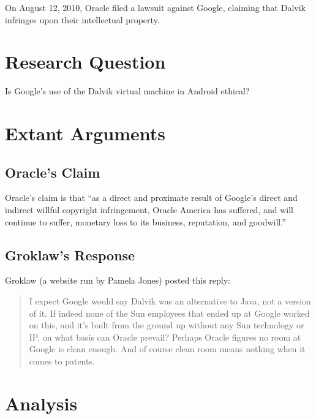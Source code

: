 \documentclass[11pt]{article}
\begin{document}
\begin{multicols}{2}
On August 12, 2010, Oracle filed a lawsuit against Google, claiming that Dalvik
infringes upon their intellectual property. \cite{oracle-lawsuit}


\section{Research Question} %
\label{sec:question}
Is Google's use of the Dalvik virtual machine in Android ethical?


\section{Extant Arguments} %
\label{sec:args}

\subsection{Oracle's Claim} %
\label{sub:args_oracle}

Oracle's claim is that ``as a direct and proximate result of Google’s direct
and indirect willful copyright infringement, Oracle America has suffered, and
will continue to suffer, monetary loss to its business, reputation, and
goodwill.'' \cite[p.~9 line 11]{oracle-lawsuit}


\subsection{Groklaw's Response} %
\label{sub:args_groklaw}

Groklaw (a website run by Pamela Jones) posted this reply: \cite{groklaw}

\begin{quotation}
I expect Google would say Dalvik was an alternative to Java, not a version of
it. If indeed none of the Sun employees that ended up at Google worked on this,
and it's built from the ground up without any Sun technology or IP, on what
basis can Oracle prevail? Perhaps Oracle figures no room at Google is clean
enough. And of course clean room means nothing when it comes to patents.
\end{quotation}



\section{Analysis} %
\label{sec:analysis}


\end{multicols}
\end{document}
